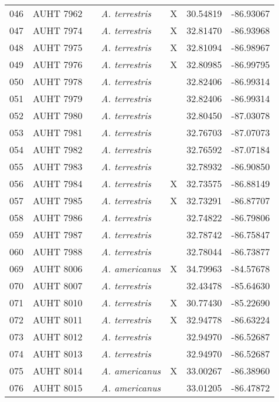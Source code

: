 \begin{longtable}{ lllllll }
046 & AUHT 7962 &  & \textit{A. terrestris} & X & 30.54819 & -86.93067 \\ 
047 & AUHT 7974 &  & \textit{A. terrestris} & X & 32.81470 & -86.93968 \\ 
048 & AUHT 7975 &  & \textit{A. terrestris} & X & 32.81094 & -86.98967 \\ 
049 & AUHT 7976 &  & \textit{A. terrestris} & X & 32.80985 & -86.99795 \\ 
050 & AUHT 7978 &  & \textit{A. terrestris} &  & 32.82406 & -86.99314 \\ 
051 & AUHT 7979 &  & \textit{A. terrestris} &  & 32.82406 & -86.99314 \\ 
052 & AUHT 7980 &  & \textit{A. terrestris} &  & 32.80450 & -87.03078 \\ 
053 & AUHT 7981 &  & \textit{A. terrestris} &  & 32.76703 & -87.07073 \\ 
054 & AUHT 7982 &  & \textit{A. terrestris} &  & 32.76592 & -87.07184 \\ 
055 & AUHT 7983 &  & \textit{A. terrestris} &  & 32.78932 & -86.90850 \\ 
056 & AUHT 7984 &  & \textit{A. terrestris} & X & 32.73575 & -86.88149 \\ 
057 & AUHT 7985 &  & \textit{A. terrestris} & X & 32.73291 & -86.87707 \\ 
058 & AUHT 7986 &  & \textit{A. terrestris} &  & 32.74822 & -86.79806 \\ 
059 & AUHT 7987 &  & \textit{A. terrestris} &  & 32.78742 & -86.75847 \\ 
060 & AUHT 7988 &  & \textit{A. terrestris} &  & 32.78044 & -86.73877 \\ 
069 & AUHT 8006 &  & \textit{A. americanus} & X & 34.79963 & -84.57678 \\ 
070 & AUHT 8007 &  & \textit{A. terrestris} &  & 32.43478 & -85.64630 \\ 
071 & AUHT 8010 &  & \textit{A. terrestris} & X & 30.77430 & -85.22690 \\ 
072 & AUHT 8011 &  & \textit{A. terrestris} & X & 32.94778 & -86.63224 \\ 
073 & AUHT 8012 &  & \textit{A. terrestris} &  & 32.94970 & -86.52687 \\ 
074 & AUHT 8013 &  & \textit{A. terrestris} &  & 32.94970 & -86.52687 \\ 
075 & AUHT 8014 &  & \textit{A. americanus} & X & 33.00267 & -86.38960 \\ 
076 & AUHT 8015 &  & \textit{A. americanus} &  & 33.01205 & -86.47872 \\ 

\end{longtable}
